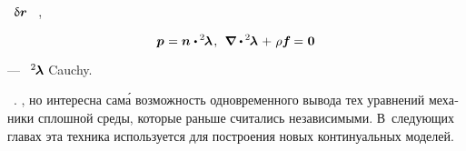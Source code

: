 \begin{otherlanguage}{russian}
\noindent
{}~$\updelta\hspace{-0.1ex}\bm{r}$   ~, 

\nopagebreak\vspace{-0.2em}\begin{equation*}
\bm{p} \hspace{.1ex} = \currentunitnormal \hspace{.1ex} \dotp \hspace{-0.1ex} {^2\hspace{-0.2ex}\bm{\lambda}} \hspace{.2ex},
\:\:
\boldnabla \hspace{.1ex} \dotp \hspace{-0.1ex} {^2\hspace{-0.2ex}\bm{\lambda}} \hspace{.2ex} + \hspace{.2ex} \rho \bm{f} \hspace{-0.1ex} = \hspace{.1ex} \zerovector
\end{equation*}

\vspace{-0.25em}\noindent
---  ~${\hspace{-0.16ex} ^2\hspace{-0.2ex}\bm{\lambda}}$  Cauchy.

   ~\cite{rabotnov-mechanicsofdeformable}.
, но интересна сам\'{а} возможность одно\-времен\-ного вывода тех уравнений механики сплошной среды, которые раньше считались независимыми.
В~следующих главах эта техника используется для построения новых континуальных моделей.

\end{otherlanguage}

\section*{\small \wordforbibliography}

